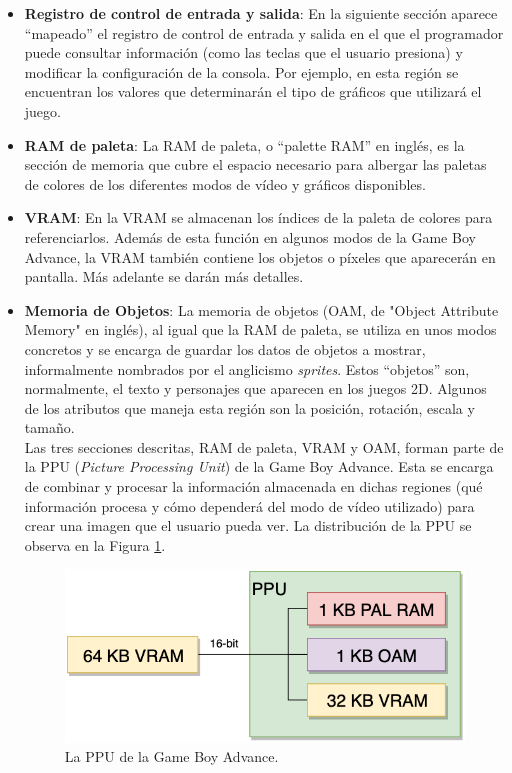 \begin{itemize}
	\item \textbf{Registro de control de entrada y salida}: En la siguiente sección aparece ``mapeado'' el registro de control de entrada y salida en el que el programador puede consultar información (como las teclas que el usuario presiona) y modificar la configuración de la consola. Por ejemplo, en esta región se encuentran los valores que determinarán el tipo de gráficos que utilizará el juego.
	\item \textbf{RAM de paleta}: La RAM de paleta, o ``palette RAM'' en inglés, es la sección de memoria que cubre el espacio necesario para albergar las paletas de colores de los diferentes modos de vídeo y gráficos disponibles.
	\item \textbf{VRAM}: En la VRAM se almacenan los índices de la paleta de colores para referenciarlos. Además de esta función en algunos modos de la Game Boy Advance, la VRAM también contiene los objetos o píxeles que aparecerán en pantalla. Más adelante se darán más detalles.
	\item \textbf{Memoria de Objetos}: La memoria de objetos (OAM, de "Object Attribute Memory" en inglés), al igual que la RAM de paleta, se utiliza en unos modos concretos y se encarga de guardar los datos de objetos a mostrar, informalmente nombrados por el anglicismo {\it sprites}. Estos ``objetos'' son, normalmente, el texto y personajes que aparecen en los juegos 2D. Algunos de los atributos que maneja esta región son la posición, rotación, escala y tamaño. \\

	Las tres secciones descritas, RAM de paleta, VRAM y OAM, forman parte de la PPU (\textit{Picture Processing Unit}) de la Game Boy Advance. Esta se encarga de combinar y procesar la información almacenada en dichas regiones (qué información procesa  y cómo dependerá del modo de vídeo utilizado) para crear una imagen que el usuario pueda ver. La distribución de la PPU se observa en la Figura \ref{fig:distribucion_2}.

	\begin{figure}[h]
	    \centering
	    \includegraphics[width=.5\textwidth]{capitulos/capitulo2/ppu.png}
	    \caption{La PPU de la Game Boy Advance.}
	    \label{fig:distribucion_2}
	\end{figure}


\end{itemize}
